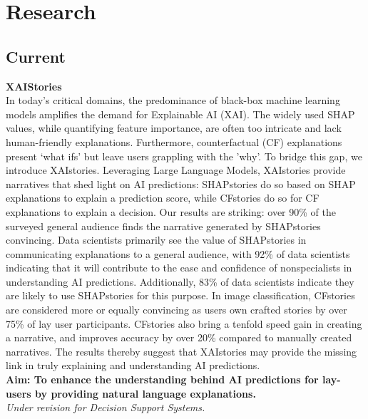 \section{Research}

\subsection{Current}

\textbf{XAIStories}\\
In today's critical domains, the predominance of black-box machine learning models amplifies the demand for 
Explainable AI (XAI). The widely used SHAP values, while quantifying feature importance, are often too 
intricate and lack human-friendly explanations. Furthermore, counterfactual (CF) explanations present 
`what ifs' but leave users grappling with the 'why'. To bridge this gap, we introduce XAIstories. 
Leveraging Large Language Models, XAIstories provide narratives that shed light on AI predictions: 
SHAPstories do so based on SHAP explanations to explain a prediction score, while CFstories do so for CF 
explanations to explain a decision. Our results are striking: over 90\% of the surveyed general audience 
finds the narrative generated by SHAPstories convincing. Data scientists primarily see the value of SHAPstories 
in communicating explanations to a general audience, with 92\% of data scientists indicating that it will contribute 
to the ease and confidence of nonspecialists in understanding AI predictions. Additionally, 83\% of data 
scientists indicate they are likely to use SHAPstories for this purpose. In image classification, 
CFstories are considered more or equally convincing as users own crafted stories by over 75\% of lay 
user participants. CFstories also bring a tenfold speed gain in creating a narrative, and improves accuracy by 
over 20\% compared to manually created narratives. The results thereby suggest that XAIstories may provide the 
missing link in truly explaining and understanding AI predictions.\\
\textbf{Aim: To enhance the understanding behind AI predictions for lay-users by providing natural language
        explanations.}\\
\textit{Under revision for Decision Support Systems.}

